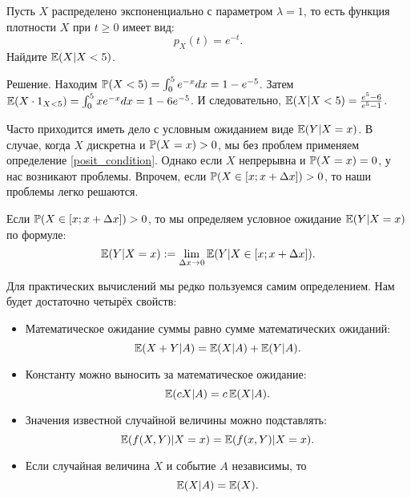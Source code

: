 \begin{myex} Пусть $ X $ распределено экспоненциально с параметром $ \lambda=1 $, то есть функция плотности $ X $ при $ t\geq 0 $ имеет вид:
\[
p_{X}(t)=e^{-t}.
\]
Найдите $ \E(X|X<5) $.

Решение. Находим $ \P(X<5)=\int_{0}^{5}e^{-x}dx=1-e^{-5} $. Затем $ \E(X\cdot 1_{X<5})=\int_{0}^{5} xe^{-x}dx=1-6e^{-5} $. И следовательно, $ \E(X|X<5)=\frac{e^{5}-6}{e^{5}-1}$.

\end{myex}


Часто приходится иметь дело с условным ожиданием виде $ \E(Y|X=x) $. В случае, когда $ X $ дискретна и $ \P(X=x)>0 $, мы без проблем применяем определение \ref{posit_condition}. Однако если $ X $ непрерывна и $ \P(X=x)=0 $, у нас возникают проблемы. Впрочем, если $ \P(X\in [x;x+\Delta x])>0$, то наши проблемы легко решаются.
\begin{mydef}
Если $ \P(X\in [x;x+\Delta x])>0 $, то мы определяем условное ожидание $ \E(Y|X=x) $ по формуле:
\begin{equation}
\E(Y|X=x):=\lim_{\Delta x\to 0}\E(Y|X\in [x;x+\Delta x]).
\end{equation}
\end{mydef}

Для практических вычислений мы редко пользуемся самим определением. Нам будет достаточно четырёх свойств:

\begin{itemize}
\item Математическое ожидание суммы равно сумме математических ожиданий:
\begin{equation}
\E(X+Y|A)=\E(X|A)+\E(Y|A).
\end{equation}
\item Константу можно выносить за математическое ожидание:
\begin{equation}
\E(cX|A)=c\E(X|A).
\end{equation}
\item Значения известной случайной величины можно подставлять:
\begin{equation}
\E(f(X,Y)|X=x)=\E(f(x,Y)|X=x).
\end{equation}
\item Если случайная величина $ X $ и событие $ A $ независимы, то
\begin{equation}
\E(X|A)=\E(X).
\end{equation}

\end{itemize}


